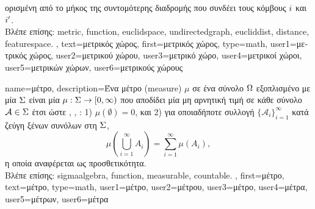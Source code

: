 {{		\foreignlanguage{greek}{ορισμένη από το μήκος της συντομότερης διαδρομής που συνδέει τους κόμβους 
		$i$ και} $i'$. 
			\\
		\foreignlanguage{greek}{Βλέπε επίσης:} \gls{metric}, \gls{function}, \gls{euclidspace}, \gls{undirectedgraph}, 
		\gls{eucliddist}, \gls{distance}, \gls{featurespace}. },
    	text={\foreignlanguage{greek}{μετρικός χώρος}}, 
	first={\foreignlanguage{greek}{μετρικός χώρος}}, 
	type=math,
	user1={\foreignlanguage{greek}{μετρικός χώρος}}, %
	user2={\foreignlanguage{greek}{μετρικού χώρου}}, %
	user3={\foreignlanguage{greek}{μετρικό χώρο}}, %
	user4={\foreignlanguage{greek}{μετρικοί χώροι}}, %
	user5={\foreignlanguage{greek}{μετρικών χώρων}}, %
	user6={\foreignlanguage{greek}{μετρικούς χώρους}} %
}

{name={\foreignlanguage{greek}{μέτρο}},
	description={\foreignlanguage{greek}{Ένα μέτρο} (measure) $\mu$ \foreignlanguage{greek}{σε ένα σύνολο 
		$\Omega$ εξοπλισμένο με μία}  $\Sigma$ \foreignlanguage{greek}{είναι μία}  
		$\mu: \Sigma \to [0, \infty)$ \foreignlanguage{greek}{που αποδίδει μία μη αρνητική τιμή σε κάθε}  
		\foreignlanguage{greek}{σύνολο $\mathcal{A} \in \Sigma$ έτσι ώστε}
		\cite{RudinBookPrinciplesMatheAnalysis}, \cite{BillingsleyProbMeasure}, \cite{HalmosMeasure}: 
		1) $\mu(\emptyset) = 0$, \foreignlanguage{greek}{και}
		2) \foreignlanguage{greek}{για οποιαδήποτε}  \foreignlanguage{greek}{συλλογή $\{\mathcal{A}_i\}_{i=1}^{\infty}$ 
		κατά ζεύγη ξένων συνόλων στη $\Sigma$,
		\[
		\mu\!\left(\bigcup_{i=1}^{\infty} A_i\right) = \sum_{i=1}^{\infty} \mu(A_i),
		\]
		η οποία αναφέρεται ως} \guillemotleft {} \foreignlanguage{greek}{προσθετικότητα}\guillemotright.
		\\
		\foreignlanguage{greek}{Βλέπε επίσης:} \gls{sigmaalgebra}, \gls{function}, \gls{measurable}, \gls{countable}. },
	first={\foreignlanguage{greek}{μέτρο}},
	text={\foreignlanguage{greek}{μέτρο}},  
	type=math,
	user1={\foreignlanguage{greek}{μέτρο}}, %
  	user2={\foreignlanguage{greek}{μέτρου}}, %
	user3={\foreignlanguage{greek}{μέτρο}}, %
	user4={\foreignlanguage{greek}{μέτρα}}, %
  	user5={\foreignlanguage{greek}{μέτρων}}, %
	user6={\foreignlanguage{greek}{μέτρα}} %
}

